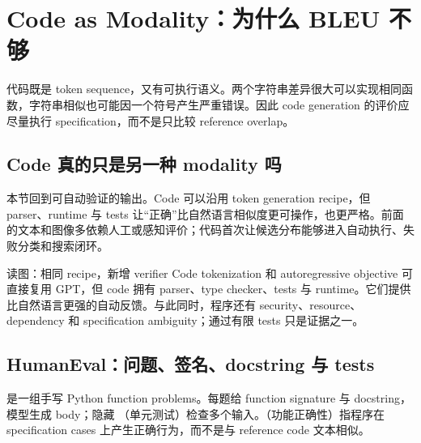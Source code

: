 \section{Code as Modality：为什么 BLEU 不够}

代码既是 token sequence，又有可执行语义。两个字符串差异很大可以实现相同函数，字符串相似也可能因一个符号产生严重错误。因此 code generation 的评价应尽量执行 specification，而不是只比较 reference overlap。

\subsection{Code 真的只是另一种 modality 吗}

本节回到可自动验证的输出。Code 可以沿用 token generation recipe，但 parser、runtime 与 tests 让“正确”比自然语言相似度更可操作，也更严格。前面的文本和图像多依赖人工或感知评价；代码首次让候选分布能够进入自动执行、失败分类和搜索闭环。


\begin{knowledgebox}{读图：相同 recipe，新增 verifier}
Code tokenization 和 autoregressive objective 可直接复用 GPT，但 code 拥有 parser、type checker、tests 与 runtime。它们提供比自然语言更强的自动反馈。与此同时，程序还有 security、resource、dependency 和 specification ambiguity；通过有限 tests 只是证据之一。
\end{knowledgebox}


\subsection{HumanEval：问题、签名、docstring 与 tests}

 是一组手写 Python function problems。每题给 function signature 与 docstring，模型生成 body；隐藏 （单元测试）检查多个输入。（功能正确性）指程序在 specification cases 上产生正确行为，而不是与 reference code 文本相似。


